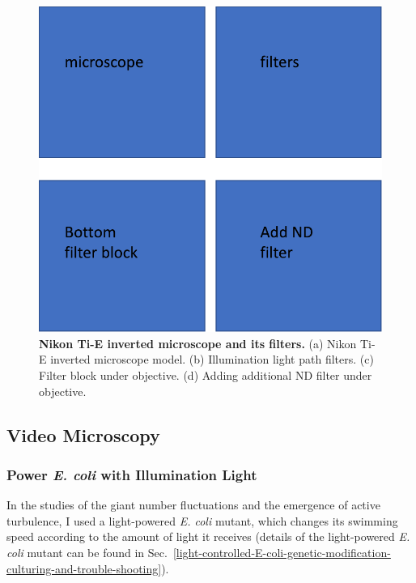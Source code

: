 \begin{figure}[!htbp]
	\begin{center}
	\includegraphics[width=5.5 in]{Figs/2-Exp/3.pdf}
	\end{center}
	\caption[Figure 2.3:]
	{
	\textbf{Nikon Ti-E inverted microscope and its filters.}
	(a) Nikon Ti-E inverted microscope model.
	(b) Illumination light path filters.
	(c) Filter block under objective.
	(d) Adding additional ND filter under objective.
	}
	\label{fig:2-3}
\end{figure}


\subsection{Video Microscopy}

\subsubsection{Power \textit{E. coli} with Illumination Light}
In the studies of the giant number fluctuations and the emergence of active turbulence, I used a light-powered \textit{E. coli} mutant, which changes its swimming speed according to the amount of light it receives (details of the light-powered \textit{E. coli} mutant can be found in Sec.~\ref{light-controlled-E-coli-genetic-modification-culturing-and-trouble-shooting}).

